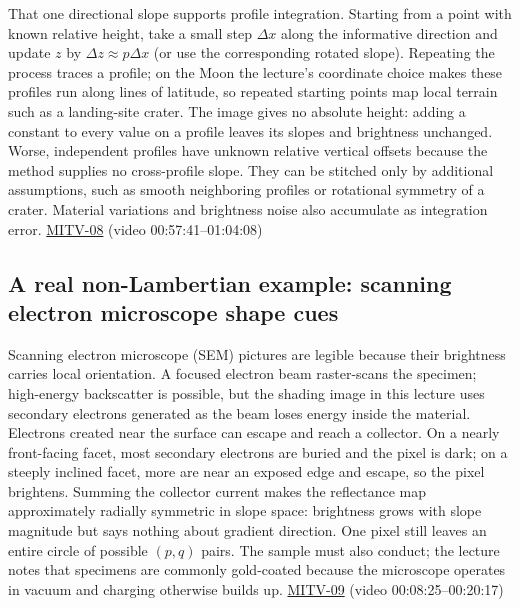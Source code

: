 That one directional slope supports profile integration. Starting from a point with known relative height, take a small step \(\Delta x\) along the informative direction and update \(z\) by \(\Delta z\approx p\Delta x\) (or use the corresponding rotated slope). Repeating the process traces a profile; on the Moon the lecture's coordinate choice makes these profiles run along lines of latitude, so repeated starting points map local terrain such as a landing-site crater. The image gives no absolute height: adding a constant to every value on a profile leaves its slopes and brightness unchanged. Worse, independent profiles have unknown relative vertical offsets because the method supplies no cross-profile slope. They can be stitched only by additional assumptions, such as smooth neighboring profiles or rotational symmetry of a crater. Material variations and brightness noise also accumulate as integration error. \hyperref[04-visual-computing-ii-ch036-mitv-08---shading-special-cases-lunar-surface-scanning-electron-microscope-greens-theorem]{MITV-08} (video 00:57:41--01:04:08)

\subsection{A real non-Lambertian example: scanning electron microscope shape cues}\label{04-visual-computing-ii-ch032-a-real-non-lambertian-example-scanning-electron-microscope-shape-cues}

\hypertarget{04-visual-computing-ii-ch032-a-real-non-lambertian-example-scanning-electron-microscope-shape-cues}{}

Scanning electron microscope (SEM) pictures are legible because their brightness carries local orientation. A focused electron beam raster-scans the specimen; high-energy backscatter is possible, but the shading image in this lecture uses secondary electrons generated as the beam loses energy inside the material. Electrons created near the surface can escape and reach a collector. On a nearly front-facing facet, most secondary electrons are buried and the pixel is dark; on a steeply inclined facet, more are near an exposed edge and escape, so the pixel brightens. Summing the collector current makes the reflectance map approximately radially symmetric in slope space: brightness grows with slope magnitude but says nothing about gradient direction. One pixel still leaves an entire circle of possible \((p,q)\) pairs. The sample must also conduct; the lecture notes that specimens are commonly gold-coated because the microscope operates in vacuum and charging otherwise builds up. \hyperref[04-visual-computing-ii-ch036-mitv-09---shape-from-shading-general-case---from-first-order-nonlinear-pde-to-five-odes]{MITV-09} (video 00:08:25--00:20:17)

